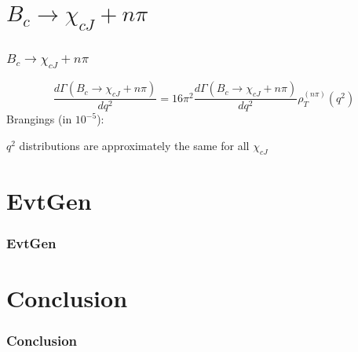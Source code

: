 \documentclass{beamer}
\begin{document}
\section{$B_c\to \chi_{cJ}+n\pi$}
\begin{frame}
  \frametitle{$B_c\to \chi_{cJ}+n\pi$}
  $$
  \frac{d\Gamma\left(B_c \to \chi_{cJ} + n\pi\right)}{dq^2} = 16\pi^2 \frac{d\Gamma\left(B_c \to \chi_{cJ} + n\pi\right)}{dq^2} \rho_T^{(n\pi)}(q^2)
  $$
  Brangings (in $10^{-5}$):
  
  $q^2$ distributions are approximately the same for all $\chi_{cJ}$
\end{frame}

\section{EvtGen}
\begin{frame}
  \frametitle{EvtGen}
\end{frame}


\section{Conclusion}
\begin{frame}
  \frametitle{Conclusion}
\end{frame}
\end{document}
